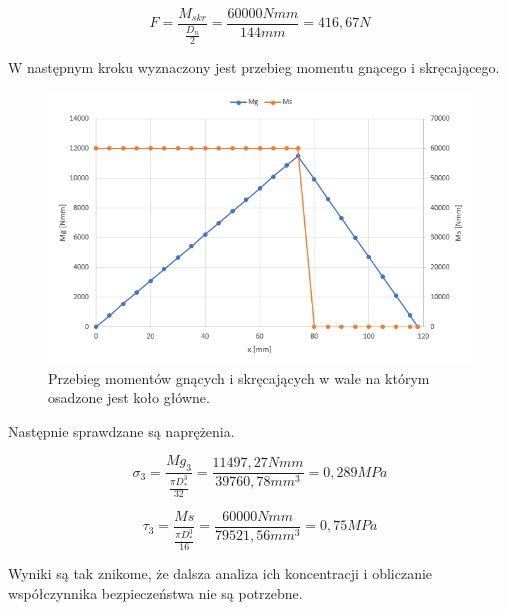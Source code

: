 		\begin{equation}
		F=\frac{M_{skr}}{\frac{D_n}{2}}=\frac{60 000Nmm}{144mm}=416,67 N
		\end{equation}
		
		W następnym kroku wyznaczony jest przebieg momentu gnącego i skręcającego.
		
		\begin{figure}[th]
			\centering
			\includegraphics[width=0.9\linewidth]{Projekt/shaft_gear_momenty}
			\caption{Przebieg momentów gnących i skręcających w wale na którym osadzone jest koło główne.} 
			\label{fig::shaft_gear_momenty}
		\end{figure}
		
		Następnie sprawdzane są naprężenia.
		
		\begin{equation}
		\sigma_3 = \frac{Mg_3}{\frac{\pi D_{*}^3}{32}}=\frac{11497,27Nmm}{39760,78 mm^3}= 0,289MPa
		\end{equation}
		
		\begin{equation}
		\tau_3 = \frac{Ms}{\frac{\pi D_{*}^3}{16}}=\frac{60 000Nmm}{79521,56 mm^3}= 0,75MPa
		\end{equation}
		
		Wyniki są tak znikome, że dalsza analiza ich koncentracji i obliczanie współczynnika bezpieczeństwa nie są potrzebne.
			
	